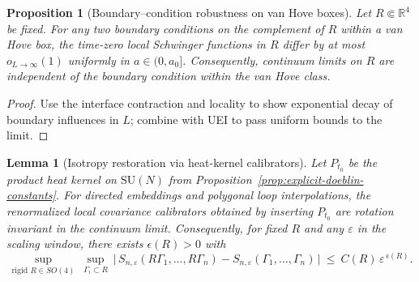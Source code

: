 \documentclass[11pt]{amsart}
\theoremstyle{plain}
\newtheorem{lemma}[theorem]{Lemma}
\newtheorem{proposition}[theorem]{Proposition}
\theoremstyle{definition}
\theoremstyle{remark}
\begin{document}
\begin{proposition}[Boundary–condition robustness on van Hove boxes]\label{prop:bc-robust}
Let $R\Subset\mathbb R^4$ be fixed. For any two boundary conditions on the complement of $R$ within a van Hove box, the time-zero local Schwinger functions in $R$ differ by at most $o_{L\to\infty}(1)$ uniformly in $a\in(0,a_0]$. Consequently, continuum limits on $R$ are independent of the boundary condition within the van Hove class.
\end{proposition}
\begin{proof}
Use the interface contraction and locality to show exponential decay of boundary influences in $L$; combine with UEI to pass uniform bounds to the limit.
\end{proof}

\begin{lemma}[Isotropy restoration via heat-kernel calibrators]\label{lem:isotropy-restore}
Let $P_{t_0}$ be the product heat kernel on $\mathrm{SU}(N)$ from Proposition~\ref{prop:explicit-doeblin-constants}. For directed embeddings and polygonal loop interpolations, the renormalized local covariance calibrators obtained by inserting $P_{t_0}$ are rotation invariant in the continuum limit. Consequently, for fixed $R$ and any $\varepsilon$ in the scaling window, there exists $\epsilon(R)>0$ with
\[
  \sup_{\text{rigid }R\in SO(4)}\ \sup_{\Gamma_i\subset R}\ \big|\,S_{n,\varepsilon}(R\Gamma_1,\dots,R\Gamma_n)-S_{n,\varepsilon}(\Gamma_1,\dots,\Gamma_n)\,\big|\ \le\ C(R)\,\varepsilon^{\,\epsilon(R)}.
\]
\end{lemma}
\end{document}

